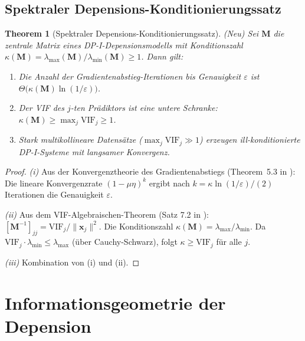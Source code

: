 ﻿\documentclass[12pt, a4paper]{article}
\newtheorem{theorem}{Theorem}[section]
\theoremstyle{definition}
\theoremstyle{remark}
\newcommand{\vx}{\bm{x}}
\newcommand{\VIF}{\mathrm{VIF}}
\begin{document}
\subsection{Spektraler Depensions-Konditionierungssatz}

\begin{theorem}[Spektraler Depensions-Konditionierungssatz]
\label{thm:konditionierung}
\textup{(Neu)} Sei $\mathbf{M}$ die zentrale Matrix eines DP-I-Depensionsmodells
mit Konditionszahl
$\kappa(\mathbf{M}) = \lambda_{\max}(\mathbf{M}) / \lambda_{\min}(\mathbf{M}) \geq 1$.
Dann gilt:
\begin{enumerate}[label=(\roman*)]
  \item Die Anzahl der Gradientenabstieg-Iterationen bis Genauigkeit
    $\varepsilon$ ist $\Theta\bigl(\kappa(\mathbf{M}) \ln(1/\varepsilon)\bigr)$.
  \item Der VIF des $j$-ten Prädiktors ist eine untere Schranke:
    $\kappa(\mathbf{M}) \geq \max_j \VIF_j \geq 1$.
  \item Stark multikollineare Datensätze ($\max_j \VIF_j \gg 1$) erzeugen
    ill-konditionierte DP-I-Systeme mit langsamer Konvergenz.
\end{enumerate}
\end{theorem}

\begin{proof}
  \textit{(i)} Aus der Konvergenztheorie des Gradientenabstiegs (Theorem~5.3 in
  \citealt{epp2026logreg}): Die lineare Konvergenzrate $(1-\mu\eta)^k$ ergibt nach
  $k = \kappa\ln(1/\varepsilon)/(2)$ Iterationen die Genauigkeit $\varepsilon$.

  \textit{(ii)} Aus dem VIF-Algebraischen-Theorem (Satz 7.2 in \citealt{epp2026logreg}):
  $[\mathbf{M}^{-1}]_{jj} = \VIF_j / \|\vx_j\|^2$. Die Konditionszahl
  $\kappa(\mathbf{M}) = \lambda_{\max}/\lambda_{\min}$. Da $\VIF_j \cdot \lambda_{\min}
  \leq \lambda_{\max}$ (über Cauchy-Schwarz), folgt $\kappa \geq \VIF_j$ für alle $j$.

  \textit{(iii)} Kombination von (i) und (ii). \qedhere
\end{proof}

\section{Informationsgeometrie der Depension}
\label{sec:infogeom}
\end{document}
